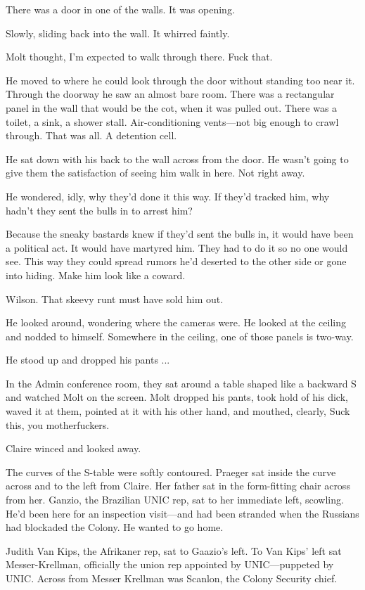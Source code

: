 There was a door in one of the walls. It was opening.

Slowly, sliding back into the wall. It whirred faintly.

Molt thought, I'm expected to walk through there. Fuck that.

He moved to where he could look through the door without standing too near it. Through the doorway he saw an almost bare room. There was a rectangular panel in the wall that would be the cot, when it was pulled out. There was a toilet, a sink, a shower stall. Air-conditioning vents—not big enough to crawl through. That was all. A detention cell.

He sat down with his back to the wall across from the door. He wasn't going to give them the satisfaction of seeing him walk in here. Not right away.

He wondered, idly, why they'd done it this way. If they'd tracked him, why hadn't they sent the bulls in to arrest him?

Because the sneaky bastards knew if they'd sent the bulls in, it would have been a political act. It would have martyred him. They had to do it so no one would see. This way they could spread rumors he'd deserted to the other side or gone into hiding. Make him look like a coward.

Wilson. That skeevy runt must have sold him out.

He looked around, wondering where the cameras were. He looked at the ceiling and nodded to himself. Somewhere in the ceiling, one of those panels is two-way.

He stood up and dropped his pants ...

In the Admin conference room, they sat around a table shaped like a backward S and watched Molt on the screen. Molt dropped his pants, took hold of his dick, waved it at them, pointed at it with his other hand, and mouthed, clearly, Suck this, you motherfuckers.

Claire winced and looked away.

The curves of the S-table were softly contoured. Praeger sat inside the curve across and to the left from Claire. Her father sat in the form-fitting chair across from her. Ganzio, the Brazilian UNIC rep, sat to her immediate left, scowling. He'd been here for an inspection visit—and had been stranded when the Russians had blockaded the Colony. He wanted to go home.

Judith Van Kips, the Afrikaner rep, sat to Gaazio's left. To Van Kips' left sat Messer-Krellman, officially the union rep appointed by UNIC—puppeted by UNIC. Across from Messer Krellman was Scanlon, the Colony Security chief.

